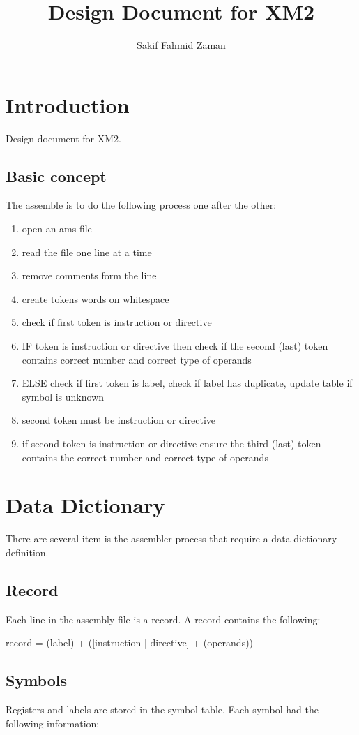 \documentclass[titlepage, 12pt]{article}
\title{Design Document for XM2}
\author{Sakif Fahmid Zaman}
\begin{document}
\maketitle\tableofcontents\clearpage
\section{Introduction}
Design document for XM2.

\subsection{Basic concept}
The assemble is to do the following process one after the other:
\begin{enumerate}
	\item open an ams file
	\item read the file one line at a time
	\item remove comments form the line
	\item create tokens words on whitespace
	\item check if first token is instruction or directive
	\item IF token is instruction or directive then check if the second (last) token contains correct number and correct type of operands
	\item ELSE check if first token is label, check if label has duplicate, update table if symbol is unknown
	\item second token must be instruction or directive
	\item if second token is instruction or directive ensure the third (last) token contains the correct number and correct type of operands
\end{enumerate}

\section{Data Dictionary}
There are several item is the assembler process that require a data dictionary definition.
\subsection{Record}
Each line in the assembly file is a record. A record contains the following:

record = (label) + ([instruction | directive] + (operands))

\subsection{Symbols}
Registers and labels are stored in the symbol table. Each symbol had the following information:
\end{document}
